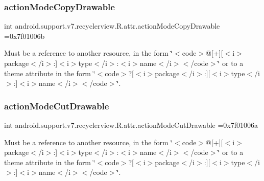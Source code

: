 \subsubsection{\texorpdfstring{action\+Mode\+Copy\+Drawable}{actionModeCopyDrawable}}
{\footnotesize\ttfamily int android.\+support.\+v7.\+recyclerview.\+R.\+attr.\+action\+Mode\+Copy\+Drawable =0x7f01006b\hspace{0.3cm}{\ttfamily [static]}}

Must be a reference to another resource, in the form \char`\"{}$<$code$>$@\mbox{[}+\mbox{]}\mbox{[}$<$i$>$package$<$/i$>$\+:\mbox{]}$<$i$>$type$<$/i$>$\+:$<$i$>$name$<$/i$>$$<$/code$>$\char`\"{} or to a theme attribute in the form \char`\"{}$<$code$>$?\mbox{[}$<$i$>$package$<$/i$>$\+:\mbox{]}\mbox{[}$<$i$>$type$<$/i$>$\+:\mbox{]}$<$i$>$name$<$/i$>$$<$/code$>$\char`\"{}. \mbox{\label{classandroid_1_1support_1_1v7_1_1recyclerview_1_1R_1_1attr_aa773989635e1d29aa29d507967239764}} 
\subsubsection{\texorpdfstring{action\+Mode\+Cut\+Drawable}{actionModeCutDrawable}}
{\footnotesize\ttfamily int android.\+support.\+v7.\+recyclerview.\+R.\+attr.\+action\+Mode\+Cut\+Drawable =0x7f01006a\hspace{0.3cm}{\ttfamily [static]}}

Must be a reference to another resource, in the form \char`\"{}$<$code$>$@\mbox{[}+\mbox{]}\mbox{[}$<$i$>$package$<$/i$>$\+:\mbox{]}$<$i$>$type$<$/i$>$\+:$<$i$>$name$<$/i$>$$<$/code$>$\char`\"{} or to a theme attribute in the form \char`\"{}$<$code$>$?\mbox{[}$<$i$>$package$<$/i$>$\+:\mbox{]}\mbox{[}$<$i$>$type$<$/i$>$\+:\mbox{]}$<$i$>$name$<$/i$>$$<$/code$>$\char`\"{}. \mbox{\label{classandroid_1_1support_1_1v7_1_1recyclerview_1_1R_1_1attr_a17350123469db2e75e26740b91d0477a}} 
